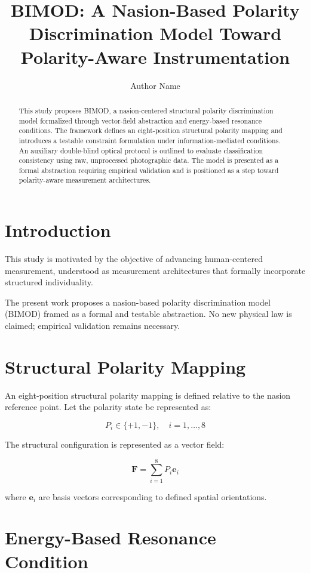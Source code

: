 \documentclass[11pt,a4paper]{article}
\title{BIMOD: A Nasion-Based Polarity Discrimination Model Toward Polarity-Aware Instrumentation}
\author{Author Name}
\date{}
\begin{document}
\maketitle

\begin{abstract}
This study proposes BIMOD, a nasion-centered structural polarity discrimination model formalized through vector-field abstraction and energy-based resonance conditions. The framework defines an eight-position structural polarity mapping and introduces a testable constraint formulation under information-mediated conditions. An auxiliary double-blind optical protocol is outlined to evaluate classification consistency using raw, unprocessed photographic data. The model is presented as a formal abstraction requiring empirical validation and is positioned as a step toward polarity-aware measurement architectures.
\end{abstract}

\section{Introduction}

This study is motivated by the objective of advancing human-centered measurement, understood as measurement architectures that formally incorporate structured individuality. 

The present work proposes a nasion-based polarity discrimination model (BIMOD) framed as a formal and testable abstraction. No new physical law is claimed; empirical validation remains necessary.

\section{Structural Polarity Mapping}

An eight-position structural polarity mapping is defined relative to the nasion reference point. Let the polarity state be represented as:

\[
P_i \in \{+1, -1\}, \quad i = 1,\dots,8
\]

The structural configuration is represented as a vector field:

\[
\mathbf{F} = \sum_{i=1}^{8} P_i \mathbf{e}_i
\]

where $\mathbf{e}_i$ are basis vectors corresponding to defined spatial orientations.

\section{Energy-Based Resonance Condition}
\end{document}
